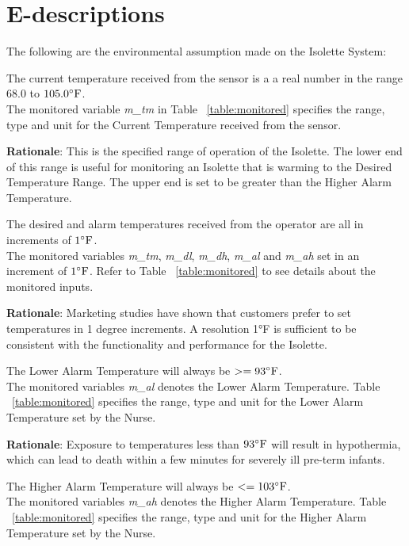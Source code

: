 \documentclass[fontsize=12pt,paper=letter,twoside]{scrartcl}
\begin{document}
\newpage
\section{E-descriptions}

The following are the environmental assumption made on the Isolette System:

\edescription
{The current temperature received from the sensor is a a real number in the range $68.0$ to $105.0 ^{\circ}\mathrm{F}$.\\}
{The monitored variable \emph{m\_tm} in Table ~\ref{table:monitored} specifies the range, type and unit for the Current Temperature received from the sensor.}
\label{E1}

\smallskip
\noindent \textbf{Rationale}: This is the specified range of operation of the Isolette. The lower end of this range is useful for monitoring an Isolette that is warming to the Desired Temperature Range. The upper end is set to be greater than the Higher Alarm Temperature.

\edescription
{The desired and alarm temperatures received from the operator are all in increments of $1 ^{\circ}\mathrm{F}$.\\}
{The monitored variables \emph{m\_tm}, \emph{m\_dl}, \emph{m\_dh}, \emph{m\_al} and \emph{m\_ah} set in an increment of $1 ^{\circ}\mathrm{F}$. Refer to Table ~\ref{table:monitored} to see details about the monitored inputs.}
\label{E2}

\smallskip
\noindent \textbf{Rationale}: Marketing studies have shown that customers prefer to set temperatures in 1 degree increments. A resolution 1°F is sufficient to be consistent with the functionality and performance for the Isolette.

\edescription
{The Lower Alarm Temperature will always be $ >= 93^{\circ}\mathrm{F}$.\\}
{The monitored variables \emph{m\_al} denotes the Lower Alarm Temperature. Table ~\ref{table:monitored} specifies the range, type and unit for the Lower Alarm Temperature set by the Nurse.}
\label{E3}

\smallskip
\noindent \textbf{Rationale}: Exposure to temperatures less than $93^{\circ}\mathrm{F}$ will result in hypothermia, which can lead to death within a few minutes for severely ill pre-term infants.

\edescription
{The Higher Alarm Temperature will always be $ <= 103^{\circ}\mathrm{F}$.\\}
{The monitored variables \emph{m\_ah} denotes the Higher Alarm Temperature. Table ~\ref{table:monitored} specifies the range, type and unit for the Higher Alarm Temperature set by the Nurse.}
\label{E4}
\end{document}
